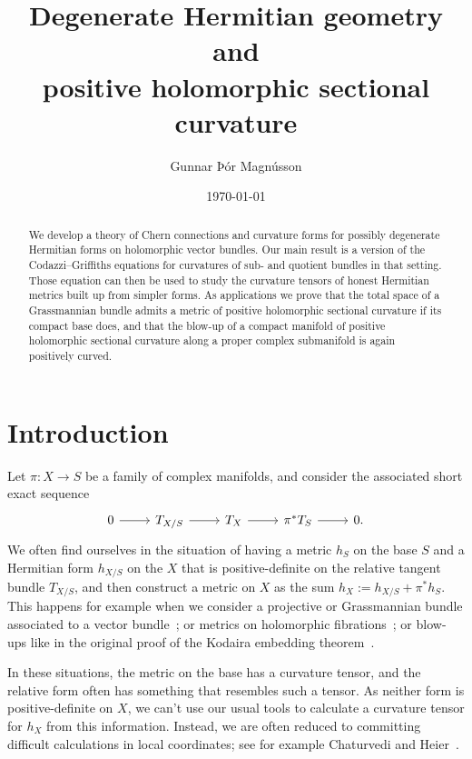 \documentclass[10pt,a4paper]{amsart}
\author{Gunnar Þór Magnússon}
\date{\today}
\title[Degenerate Hermitian geometry]{Degenerate Hermitian geometry and\\
positive holomorphic sectional curvature}
\theoremstyle{definition}
\begin{document}
\begin{abstract}
We develop a theory of Chern connections and curvature forms for possibly
degenerate Hermitian forms on holomorphic vector bundles.
Our main result is a version of the Codazzi--Griffiths equations for curvatures
of sub- and quotient bundles in that setting.
Those equation can then be used to study the curvature tensors of
honest Hermitian metrics built up from simpler forms.
As applications we prove that the total space of a Grassmannian bundle admits a
metric of positive holomorphic sectional curvature if its compact base does,
and that the blow-up of a compact manifold of positive holomorphic sectional
curvature along a proper complex submanifold is again positively curved.
\end{abstract}


\maketitle






\section*{Introduction}

Let $\pi : X \to S$ be a family of complex manifolds, and consider the associated short exact sequence
\[
\begin{tikzcd}
0 \ar[r] & T_{X/S} \ar[r] & T_X \ar[r] & \pi^*T_S \ar[r] & 0.
\end{tikzcd}
\]
We often find ourselves in the situation of having a metric $h_S$ on the base
$S$ and a Hermitian form $h_{X/S}$ on the $X$ that is positive-definite on the
relative tangent bundle $T_{X/S}$, and then construct a metric on $X$ as the
sum $h_X := h_{X/S} + \pi^*h_S$. This happens for example when we consider a
projective or Grassmannian bundle associated to a vector
bundle~\cite{alvarez2016positive,alvarez2018projectivized,yang2019hirzebruch};
or metrics on holomorphic fibrations~\cite{calabi-fibres-holomorphes};
or blow-ups like in the original proof of the Kodaira embedding
theorem~\cite{kodaira-embedding}.

In these situations, the metric on the base has a curvature tensor, and the relative form often has something that resembles such a tensor. As neither form is positive-definite on $X$, we can't use our usual tools to calculate a curvature tensor for $h_X$ from this information. Instead, we are often reduced to committing difficult calculations in local coordinates; see for example Chaturvedi and Heier~\cite[Theorem~1.1]{chaturvedi2020hermitian}.
\end{document}
